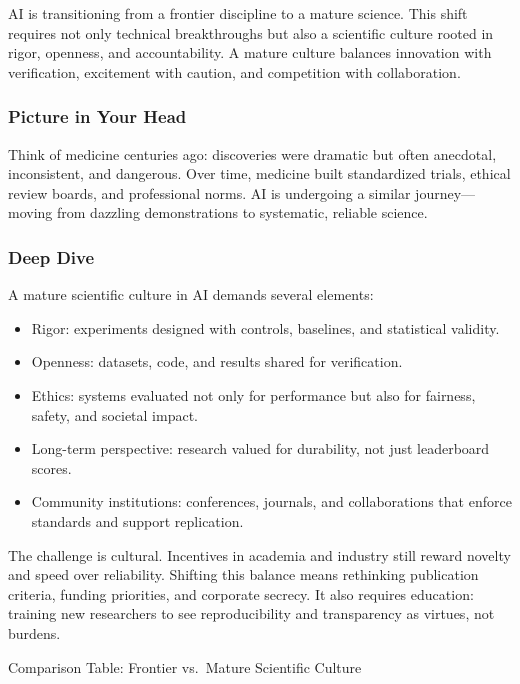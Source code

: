 \documentclass[
  letterpaper,
  DIV=11,
  numbers=noendperiod]{scrreprt}
\providecommand{\tightlist}{%
  \setlength{\itemsep}{0pt}\setlength{\parskip}{0pt}}
\begin{document}
AI is transitioning from a frontier discipline to a mature science. This
shift requires not only technical breakthroughs but also a scientific
culture rooted in rigor, openness, and accountability. A mature culture
balances innovation with verification, excitement with caution, and
competition with collaboration.

\subsubsection{Picture in Your Head}\label{picture-in-your-head-99}

Think of medicine centuries ago: discoveries were dramatic but often
anecdotal, inconsistent, and dangerous. Over time, medicine built
standardized trials, ethical review boards, and professional norms. AI
is undergoing a similar journey---moving from dazzling demonstrations to
systematic, reliable science.

\subsubsection{Deep Dive}\label{deep-dive-99}

A mature scientific culture in AI demands several elements:

\begin{itemize}
\tightlist
\item
  Rigor: experiments designed with controls, baselines, and statistical
  validity.
\item
  Openness: datasets, code, and results shared for verification.
\item
  Ethics: systems evaluated not only for performance but also for
  fairness, safety, and societal impact.
\item
  Long-term perspective: research valued for durability, not just
  leaderboard scores.
\item
  Community institutions: conferences, journals, and collaborations that
  enforce standards and support replication.
\end{itemize}

The challenge is cultural. Incentives in academia and industry still
reward novelty and speed over reliability. Shifting this balance means
rethinking publication criteria, funding priorities, and corporate
secrecy. It also requires education: training new researchers to see
reproducibility and transparency as virtues, not burdens.

Comparison Table: Frontier vs.~Mature Scientific Culture
\end{document}
